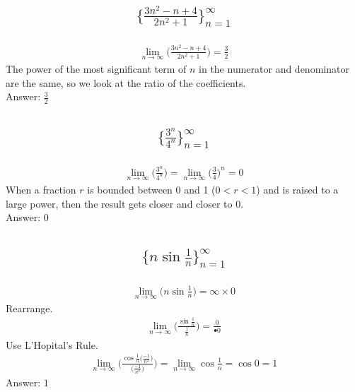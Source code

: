 \documentclass{article}
\begin{document}
\subsection{
	\begin{align*}
		\biggl\{ \frac{3n^2 - n + 4}{2n^2 + 1} \biggl\}_{n=1}^\infty
	\end{align*}
}
\begin{align*}
	\lim_{n \to \infty} \bigg( \frac{3n^2 - n + 4}{2n^2 + 1} \bigg) = \frac{3}{2}
\end{align*}
The power of the most significant term of $n$ in the numerator and denominator are the same, so we look at the ratio of the coefficients. \\[10pt]
Answer: $\frac{3}{2}$

\subsection{
	\begin{align*}
		\biggl\{ \frac{3^n}{4^n} \biggl\}_{n=1}^\infty
	\end{align*}
}
\begin{align*}
	\lim_{n \to \infty} \bigg( \frac{3^n}{4^n} \bigg) = \lim_{n \to \infty} \bigg( \frac{3}{4} \bigg)^n = 0
\end{align*}
When a fraction $r$ is bounded between 0 and 1 ($0 < r < 1$) and is raised to a large power, then the result gets closer and closer to 0. \\[10pt]
Answer: $0$

\subsection{
	\begin{align*}
		\biggl\{ n\sin{\frac{1}{n}} \biggl\}_{n=1}^\infty
	\end{align*}
}
\begin{align*}
	\lim_{n \to \infty} \bigg( n \sin{\frac{1}{n}} \bigg) = \infty \times 0
\end{align*}
Rearrange.
\begin{align*}
	\lim_{n \to \infty} \bigg( \frac{\sin{\frac{1}{n}}}{\frac{1}{n}} \bigg) = \frac{0}{•0}
\end{align*}
Use L'Hopital's Rule.
\begin{align*}
	\lim_{n \to \infty} \Bigg( \frac{\cos{\frac{1}{n}} \bigg( \frac{-1}{n^2} \bigg)}{\bigg( \frac{-1}{n^2} \bigg)} \Bigg) = \lim_{n \to \infty} \cos{\frac{1}{n}} = \cos{0} = 1
\end{align*}
Answer: $1$
\end{document}
